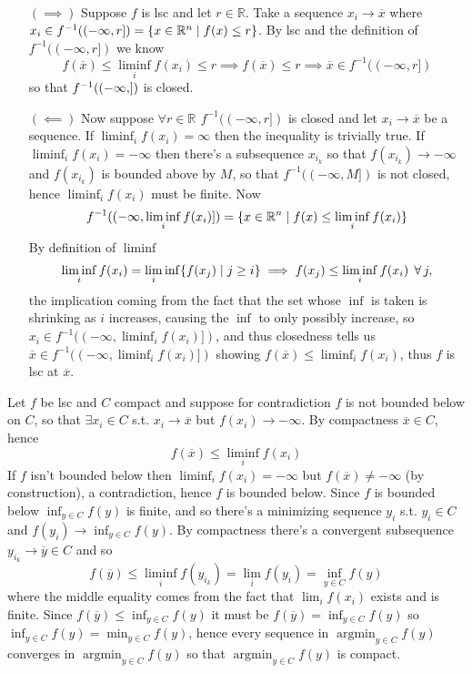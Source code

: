 \documentclass{article}
\newenvironment{ex}[1]
  {\renewcommand\theexercise{#1}\exercise}
  {\endexercise}
\DeclareMathOperator*{\argmin}{arg min}
\newcommand{\R}[1]{\mathbb{R}^{#1}}
\begin{document}
\begin{ex}{2.21} \, \\
  \newcommand{\xb}{\overline{x}}
  \newcommand{\pref}[1]{f^{-1}((-\infty, #1])}
  \begin{itemize}
    \item[$(\implies)$]
      Suppose $f$ is lsc and let $r \in \mathbb{R}$. Take a sequence $x_i \to \xb$ where $x_i \in \pref{r} = \braces{ x \in \R{n} \mid f(x) \le r }$. By lsc and the definition of $\pref{r}$ we know
      $$
      f(\xb) \le \liminf_i f(x_i) \le r \implies f(\xb) \le r \implies \xb \in \pref{r}
      $$
      so that $\pref$ is closed.
    \item[$(\impliedby)$] Now suppose $\forall r \in \R{}$ $\pref{r}$ is closed and let $x_i \to \xb$ be a sequence. If $\liminf_i f(x_i) = \infty$ then the inequality is trivially true. If $\liminf_i f(x_i) = -\infty$ then there's a subsequence $x_{i_k}$ so that $f(x_{i_k}) \to -\infty$ and $f(x_{i_k})$ is bounded above by $M$, so that $\pref{M}$ is not closed, hence $\liminf_i f(x_i)$ must be finite. Now
      $$
      \pref{\liminf_i f(x_i)} = \braces{ x \in \R{n} \mid f(x) \le \liminf_i f(x_i) }
      $$
      By definition of $\liminf$
      $$
      \liminf_i f(x_i) = \lim_i \inf \braces{ f(x_j) \mid j \ge i } \implies f(x_j) \le \liminf_i f(x_i) \, \forall j,
      $$
      the implication coming from the fact that the set whose $\inf$ is taken is shrinking as $i$ increases, causing the $\inf$ to only possibly increase, so $x_i \in \pref{\liminf_i f(x_i)}$, and thus closedness tells us $\xb \in \pref{\liminf_i f(x_i)}$ showing $f(\xb) \le \liminf_i f(x_i)$, thus $f$ is lsc at $\xb$.
  \end{itemize}
\end{ex}
\begin{ex}{2.22}
  \newcommand{\xb}{\overline{x}}
  \newcommand{\yb}{\overline{y}}
  Let $f$ be lsc and $C$ compact and suppose for contradiction $f$ is not bounded below on $C$, so that $\exists x_i \in C$ s.t. $x_i \to \xb$ but $f(x_i) \to -\infty$. By compactness $\xb \in C$, hence
  $$
  f(\xb) \le \liminf_i f(x_i)
  $$
  If $f$ isn't bounded below then $\liminf_i f(x_i) = -\infty$ but $f(\xb) \ne -\infty$ (by construction), a contradiction, hence $f$ is bounded below. Since $f$ is bounded below $\inf_{y \in C} f(y)$ is finite, and so there's a minimizing sequence $y_i$ s.t. $y_i \in C$ and $f(y_i) \to \inf_{y \in C} f(y)$. By compactness there's a convergent subsequence $y_{i_k} \to \yb \in C$ and so
  $$
  f(\yb) \le \liminf_i f(y_{i_k}) = \lim_i f(y_i) = \inf_{y \in C} f(y)
  $$
  where the middle equality comes from the fact that $\lim_i f(x_i)$ exists and is finite. Since $f(\yb) \le \inf_{y \in C} f(y)$ it must be $f(\yb) = \inf_{y \in C} f(y)$ so $\inf_{y \in C} f(y) = \min_{y \in C} f(y)$, hence every sequence in $\argmin_{y \in C} f(y)$ converges in $\argmin_{y \in C} f(y)$ so that $\argmin_{y \in C} f(y)$ is compact.
\end{ex}
\end{document}
